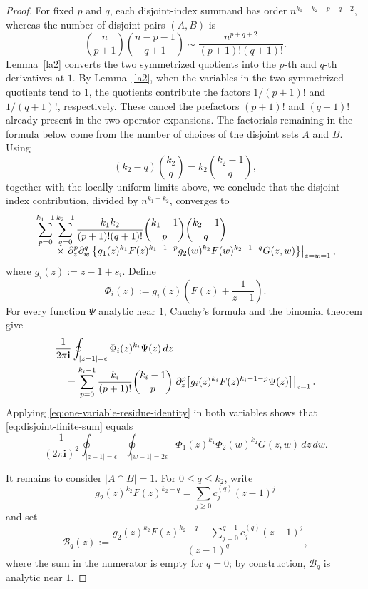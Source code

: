 \documentclass[11pt]{amsart}
\theoremstyle{plain}
\numberwithin{equation}{section}
\numberwithin{theorem}{section}
\numberwithin{figure}{section}
\begin{document}
\begin{proof}
For fixed \(p\) and \(q\), each disjoint-index summand has order
\(n^{k_1+k_2-p-q-2}\), whereas the number of disjoint pairs
\((A,B)\) is
\[
    \binom{n}{p+1}\binom{n-p-1}{q+1}
    \sim
    \frac{n^{p+q+2}}{(p+1)!(q+1)!}.
\]
Lemma~\ref{la2} converts the two symmetrized quotients into the
\(p\)-th and \(q\)-th derivatives at \(1\). By Lemma~\ref{la2}, when the variables in the two symmetrized
quotients tend to \(1\), the quotients contribute the factors
\(1/(p+1)!\) and \(1/(q+1)!\), respectively. These cancel the
prefactors \((p+1)!\) and \((q+1)!\) already present in the two
operator expansions. The factorials remaining in the formula below
come from the number of choices of the disjoint sets \(A\) and \(B\). Using
\[
    (k_2-q)\binom{k_2}{q}
    =
    k_2\binom{k_2-1}{q},
\]
together with the locally uniform limits above, we conclude that the
disjoint-index contribution, divided by \(n^{k_1+k_2}\), converges to
\begin{align}
&\sum_{p=0}^{k_1-1}\sum_{q=0}^{k_2-1}
\frac{k_1k_2}{(p+1)!(q+1)!}
\binom{k_1-1}{p}\binom{k_2-1}{q}
\notag\\[-2mm]
&\qquad{}\times
\left.
\partial_z^p\partial_w^q
\left\{
    g_1(z)^{k_1}F(z)^{k_1-1-p}
    g_2(w)^{k_2}F(w)^{k_2-1-q}
    G(z,w)
\right\}
\right|_{z=w=1},
\label{eq:disjoint-finite-sum}
\end{align}
where \(g_i(z):=z-1+s_i\).  Define
\[
    \Phi_i(z)
    :=g_i(z)\left(F(z)+\frac1{z-1}\right).
\]
For every function $\Psi$ analytic near $1$, Cauchy's formula and the
binomial theorem give
\begin{align}
&\frac1{2\pi\mathbf i}
\oint_{|z-1|=\epsilon}\Phi_i(z)^{k_i}\Psi(z)\,dz
\notag\\
&\quad=
\sum_{p=0}^{k_i-1}
\frac{k_i}{(p+1)!}\binom{k_i-1}{p}
\left.
\partial_z^p
\bigl[g_i(z)^{k_i}F(z)^{k_i-1-p}\Psi(z)\bigr]
\right|_{z=1}.
\label{eq:one-variable-residue-identity}
\end{align}
Applying \eqref{eq:one-variable-residue-identity} in both variables
shows that \eqref{eq:disjoint-finite-sum} equals
\begin{equation}
\frac1{(2\pi\mathbf i)^2}
\oint_{|z-1|=\epsilon}\oint_{|w-1|=2\epsilon}
    \Phi_1(z)^{k_1}\Phi_2(w)^{k_2}G(z,w)\,dz\,dw.
\label{eq:disjoint-contour}
\end{equation}

It remains to consider $|A\cap B|=1$.  For $0\le q\le k_2$, write
\[
    g_2(z)^{k_2}F(z)^{k_2-q}
    =\sum_{j\ge0}c_j^{(q)}(z-1)^j
\]
and set
\[
    \mathcal B_q(z)
    :=
    \frac{
        g_2(z)^{k_2}F(z)^{k_2-q}
        -\sum_{j=0}^{q-1}c_j^{(q)}(z-1)^j
    }{(z-1)^q},
\]
where the sum in the numerator is empty for $q=0$; by construction,
$\mathcal B_q$ is analytic near $1$.  



\end{proof}
\end{document}
